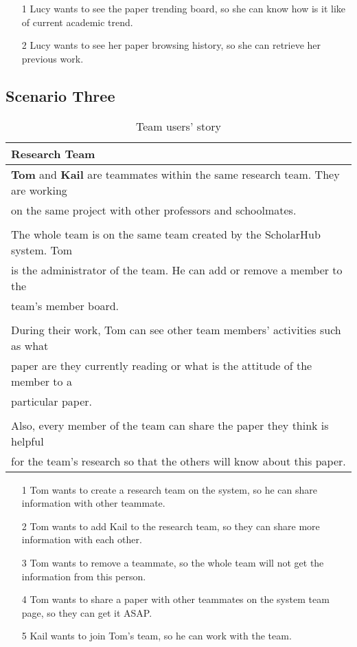 \begin{itemize}
    \item [1] Lucy wants to see the paper trending board, so she can know how is it like of current academic trend.
    \item [2] Lucy wants to see her paper browsing history, so she can retrieve her previous work.
\end{itemize}

\subsection*{Scenario Three}

\begin{table}[!ht]
    \centering
	\begin{tabular}{ l }
		\hline
		\textbf{Research Team}                               \\
		\hline
		\textbf{Tom} and \textbf{Kail} are teammates within the same research team. They are working \\
        on the same project with other professors and schoolmates.                                              \\
		\\
		The whole team is on the same team created by the ScholarHub system. Tom\\
        is the administrator of the team. He can add or remove a member to the \\
        team's member board.                   \\
		\\
		During their work, Tom can see other team members' activities such as what \\
        paper are they currently reading or what is the attitude of the member to a \\
        particular paper.                 \\
		\\
		Also, every member of the team can share the paper they think is helpful \\
        for the team's research so that the others will know about this paper.                                        \\
		\hline
	\end{tabular}
	\caption{Team users' story}
	\label{table:us3}
\end{table}

\begin{itemize}
    \item [1] Tom wants to create a research team on the system, so he can share information with other teammate.
    \item [2] Tom wants to add Kail to the research team, so they can share more information with each other.
    \item [3] Tom wants to remove a teammate, so the whole team will not get the information from this person.
    \item [4] Tom wants to share a paper with other teammates on the system team page, so they can get it ASAP.
    \item [5] Kail wants to join Tom's team, so he can work with the team.
\end{itemize}
